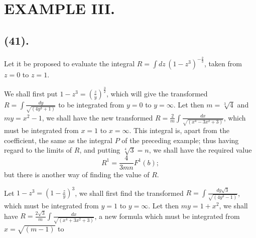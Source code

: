 \documentclass{article}
\begin{document}
\section*{EXAMPLE III.}

\subsection*{(41).}

Let it be proposed to evaluate the integral $R=\displaystyle\int dz\,(1-z^{3})^{-\frac{2}{3}}$, taken from $z=0$ to $z=1$.

We shall first put $1-z^{3}=\left(\frac{z}{y}\right)^{\frac{3}{2}}$, which will give the transformed $R=\displaystyle\int\frac{dy}{\sqrt{(4y^{3}+1)}}$ to be integrated from $y=0$ to $y=\infty$. Let then $m=\sqrt[3]{4}$ and $my=x^{2}-1$, we shall have the new transformed $R=\frac{2}{m}\displaystyle\int\frac{dx}{\sqrt{(x^{4}-3x^{2}+3)}}$, which must be integrated from $x=1$ to $x=\infty$. This integral is, apart from the coefficient, the same as the integral $P$ of the preceding example; thus having regard to the limits of $R$, and putting $\sqrt[4]{3}=n$, we shall have the required value
\[ R^{1}=\frac{4}{3mn}F^{1}(b); \]
but there is another way of finding the value of $R$.

Let $1-z^{3}=\left(1-\frac{z}{y}\right)^{3}$, we shall first find the transformed $R=\displaystyle\int\frac{dy\sqrt{3}}{\sqrt{(4y^{3}-1)}}$, which must be integrated from $y=1$ to $y=\infty$. Let then $my=1+x^{2}$, we shall have $R=\frac{2\sqrt{3}}{m}\displaystyle\int\frac{dx}{\sqrt{(x^{4}+3x^{2}+3)}}$, a new formula which must be integrated from $x=\sqrt{(m-1)}$ to
\end{document}
